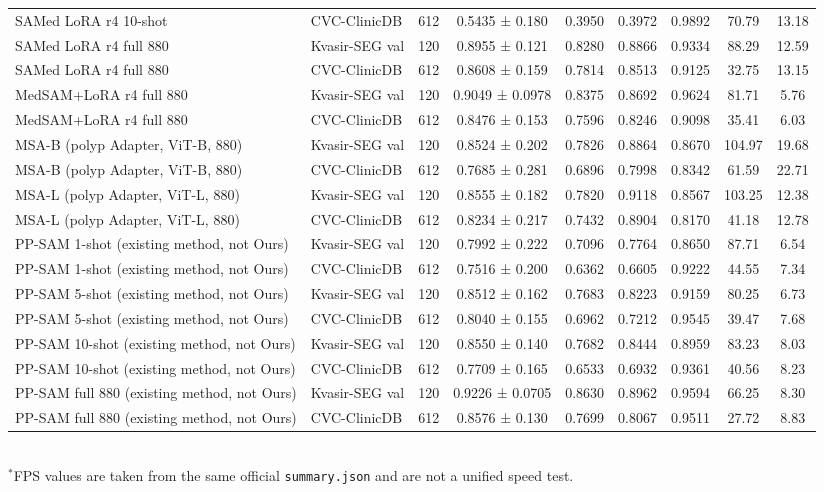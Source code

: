 \begin{table}[ht]
\begin{tabular}{llccccccc}
SAMed LoRA r4 10-shot & CVC-ClinicDB & 612 & 0.5435 ± 0.180 & 0.3950 & 0.3972 & 0.9892 & 70.79 & 13.18 \\
SAMed LoRA r4 full 880 & Kvasir-SEG val & 120 & 0.8955 ± 0.121 & 0.8280 & 0.8866 & 0.9334 & 88.29 & 12.59 \\
SAMed LoRA r4 full 880 & CVC-ClinicDB & 612 & 0.8608 ± 0.159 & 0.7814 & 0.8513 & 0.9125 & 32.75 & 13.15 \\
MedSAM+LoRA r4 full 880 & Kvasir-SEG val & 120 & 0.9049 ± 0.0978 & 0.8375 & 0.8692 & 0.9624 & 81.71 & 5.76 \\
MedSAM+LoRA r4 full 880 & CVC-ClinicDB & 612 & 0.8476 ± 0.153 & 0.7596 & 0.8246 & 0.9098 & 35.41 & 6.03 \\
MSA-B (polyp Adapter, ViT-B, 880) & Kvasir-SEG val & 120 & 0.8524 ± 0.202 & 0.7826 & 0.8864 & 0.8670 & 104.97 & 19.68 \\
MSA-B (polyp Adapter, ViT-B, 880) & CVC-ClinicDB & 612 & 0.7685 ± 0.281 & 0.6896 & 0.7998 & 0.8342 & 61.59 & 22.71 \\
MSA-L (polyp Adapter, ViT-L, 880) & Kvasir-SEG val & 120 & 0.8555 ± 0.182 & 0.7820 & 0.9118 & 0.8567 & 103.25 & 12.38 \\
MSA-L (polyp Adapter, ViT-L, 880) & CVC-ClinicDB & 612 & 0.8234 ± 0.217 & 0.7432 & 0.8904 & 0.8170 & 41.18 & 12.78 \\
PP-SAM 1-shot (existing method, not Ours) & Kvasir-SEG val & 120 & 0.7992 ± 0.222 & 0.7096 & 0.7764 & 0.8650 & 87.71 & 6.54 \\
PP-SAM 1-shot (existing method, not Ours) & CVC-ClinicDB & 612 & 0.7516 ± 0.200 & 0.6362 & 0.6605 & 0.9222 & 44.55 & 7.34 \\
PP-SAM 5-shot (existing method, not Ours) & Kvasir-SEG val & 120 & 0.8512 ± 0.162 & 0.7683 & 0.8223 & 0.9159 & 80.25 & 6.73 \\
PP-SAM 5-shot (existing method, not Ours) & CVC-ClinicDB & 612 & 0.8040 ± 0.155 & 0.6962 & 0.7212 & 0.9545 & 39.47 & 7.68 \\
PP-SAM 10-shot (existing method, not Ours) & Kvasir-SEG val & 120 & 0.8550 ± 0.140 & 0.7682 & 0.8444 & 0.8959 & 83.23 & 8.03 \\
PP-SAM 10-shot (existing method, not Ours) & CVC-ClinicDB & 612 & 0.7709 ± 0.165 & 0.6533 & 0.6932 & 0.9361 & 40.56 & 8.23 \\
PP-SAM full 880 (existing method, not Ours) & Kvasir-SEG val & 120 & 0.9226 ± 0.0705 & 0.8630 & 0.8962 & 0.9594 & 66.25 & 8.30 \\
PP-SAM full 880 (existing method, not Ours) & CVC-ClinicDB & 612 & 0.8576 ± 0.130 & 0.7699 & 0.8067 & 0.9511 & 27.72 & 8.83 \\
\bottomrule
\end{tabular}
\\[0.4em]{\small $^*$FPS values are taken from the same official \texttt{summary.json} and are not a unified speed test.}
\end{table}
